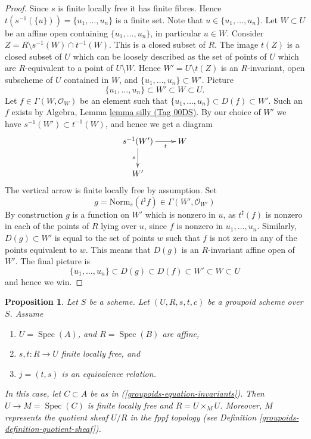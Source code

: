 \documentclass{amsart}
\theoremstyle{plain}
\newtheorem{proposition}[subsection]{Proposition}
\theoremstyle{definition}
\theoremstyle{remark}
\numberwithin{equation}{subsection}
\def\Spec{\mathop{\mathrm{Spec}}}
\begin{document}
\begin{proof}
Since $s$ is finite locally free it has finite fibres. Hence
$t(s^{-1}(\{u\})) = \{u_1, \ldots, u_n\}$ is a finite set.
Note that $u \in \{u_1, \ldots, u_n\}$.
Let $W \subset U$ be an affine open containing $\{u_1, \ldots, u_n\}$,
in particular $u \in W$. Consider
$Z = R \setminus s^{-1}(W) \cap t^{-1}(W)$. This is a closed subset
of $R$. The image $t(Z)$ is a closed subset of $U$ which can be loosely
described as the set of points of $U$ which are $R$-equivalent to a point
of $U \setminus W$. Hence $W' = U \setminus t(Z)$ is an $R$-invariant, open
subscheme of $U$ contained in $W$, and $\{u_1, \ldots, u_n\} \subset W'$.
Picture
$$
\{u_1, \ldots, u_n\} \subset W' \subset W \subset U.
$$
Let $f \in \Gamma(W, \mathcal{O}_W)$ be an element such that
$\{u_1, \ldots, u_n\} \subset D(f) \subset W'$. Such an $f$ exists by
Algebra, Lemma \href{https://stacks.math.columbia.edu/tag/00DS}{lemma silly (Tag 00DS)}. By our choice of $W'$ we
have $s^{-1}(W') \subset t^{-1}(W)$, and hence we get a diagram
$$
\xymatrix{
s^{-1}(W') \ar[d]_s \ar[r]_-t & W \\
W'
}
$$
The vertical arrow is finite locally free by assumption. Set
$$
g = \text{Norm}_s(t^\sharp f) \in \Gamma(W', \mathcal{O}_{W'})
$$
By construction $g$ is a function on $W'$ which is
nonzero in $u$, as $t^\sharp(f)$ is nonzero in each of the points of
$R$ lying over $u$, since $f$ is nonzero in $u_1, \ldots, u_n$.
Similarly, $D(g) \subset W'$ is equal to the
set of points $w$ such that $f$ is not zero in any of the points
equivalent to $w$. This means that $D(g)$ is an
$R$-invariant affine open of $W'$. The final picture is
$$
\{u_1, \ldots, u_n\} \subset D(g) \subset D(f) \subset W' \subset W \subset U
$$
and hence we win.
\end{proof}


\begin{proposition}
\label{groupoids-proposition-finite-flat-equivalence}
Let $S$ be a scheme.
Let $(U, R, s, t, c)$ be a groupoid scheme over $S$.
Assume
\begin{enumerate}
\item $U = \Spec(A)$, and $R = \Spec(B)$ are affine,
\item $s, t : R \to U$ finite locally free, and
\item $j = (t, s)$ is an equivalence relation.
\end{enumerate}
In this case, let $C \subset A$ be as in
(\ref{groupoids-equation-invariants}). Then $U \to M = \Spec(C)$
is finite locally free and $R = U \times_M U$.
Moreover, $M$ represents the quotient sheaf $U/R$
in the fppf topology (see Definition \ref{groupoids-definition-quotient-sheaf}).
\end{proposition}
\end{document}

